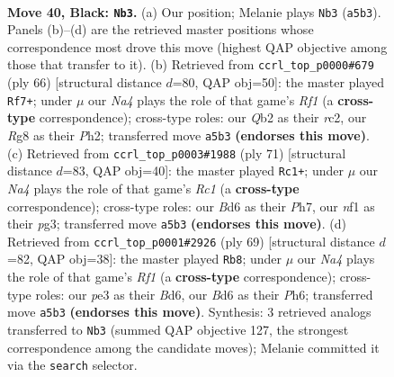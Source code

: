 \documentclass[11pt]{article}
\begin{document}
\clearpage

\begin{figure}[p]\centering
\begin{subfigure}{0.46\textwidth}\centering
\resizebox{\linewidth}{!}{%
\newchessgame
\chessboard[
  setfen={r5r1/p5pp/2kb4/n2p2QP/p2P2P1/4P2K/1q6/3R1N2 b - - 2 40},
  showmover=false,
  pgfstyle=straightmove, color=movearrow, markmove={a5-b3}
]}
\caption{}
\end{subfigure}\hfill
\begin{subfigure}{0.46\textwidth}\centering
\resizebox{\linewidth}{!}{%
\newchessgame
\chessboard[
  setfen={3Q4/7k/p5pb/P3p2p/1p2q3/3p4/1Pr3PP/R4R1K w - - 2 34},
  showmover=false,
  pgfstyle=straightmove, color=movearrow, markmove={f1-f7}
]}
\caption{}
\end{subfigure}
\\[4pt]
\begin{subfigure}{0.46\textwidth}\centering
\resizebox{\linewidth}{!}{%
\newchessgame
\chessboard[
  setfen={1rr3k1/3q3p/1p1p2p1/3Pp3/P3Q2P/R5P1/1R3P2/6K1 b - - 0 36},
  showmover=false,
  pgfstyle=straightmove, color=movearrow, markmove={c8-c1}
]}
\caption{}
\end{subfigure}\hfill
\begin{subfigure}{0.46\textwidth}\centering
\resizebox{\linewidth}{!}{%
\newchessgame
\chessboard[
  setfen={5rk1/5pp1/q1pb3p/3n4/P2P4/1Q3N2/5BPP/R6K b - - 1 35},
  showmover=false,
  pgfstyle=straightmove, color=movearrow, markmove={f8-b8}
]}
\caption{}
\end{subfigure}
\caption{\textbf{Move 40, Black: \texttt{Nb3}.} (a) Our position; Melanie plays \texttt{Nb3} (\texttt{a5b3}). Panels (b)--(d) are the retrieved master positions whose correspondence most drove this move (highest QAP objective among those that transfer to it). (b) Retrieved from \texttt{ccrl\_top\_p0000\#679} (ply 66) [structural distance $d$=80, QAP obj=50]: the master played \texttt{Rf7+}; under $\mu$ our \emph{Na4} plays the role of that game's \emph{Rf1} (a \textbf{cross-type} correspondence); cross-type roles: our \emph{Q}b2 as their \emph{r}c2, our \emph{R}g8 as their \emph{P}h2; transferred move \texttt{a5b3} \textbf{(endorses this move)}. (c) Retrieved from \texttt{ccrl\_top\_p0003\#1988} (ply 71) [structural distance $d$=83, QAP obj=40]: the master played \texttt{Rc1+}; under $\mu$ our \emph{Na4} plays the role of that game's \emph{Rc1} (a \textbf{cross-type} correspondence); cross-type roles: our \emph{B}d6 as their \emph{P}h7, our \emph{n}f1 as their \emph{p}g3; transferred move \texttt{a5b3} \textbf{(endorses this move)}. (d) Retrieved from \texttt{ccrl\_top\_p0001\#2926} (ply 69) [structural distance $d$=82, QAP obj=38]: the master played \texttt{Rb8}; under $\mu$ our \emph{Na4} plays the role of that game's \emph{Rf1} (a \textbf{cross-type} correspondence); cross-type roles: our \emph{p}e3 as their \emph{B}d6, our \emph{B}d6 as their \emph{P}h6; transferred move \texttt{a5b3} \textbf{(endorses this move)}. Synthesis: 3 retrieved analogs transferred to \texttt{Nb3} (summed QAP objective 127, the strongest correspondence among the candidate moves); Melanie committed it via the \texttt{search} selector.}
\label{fig:thought-m79}
\end{figure}
\end{document}
